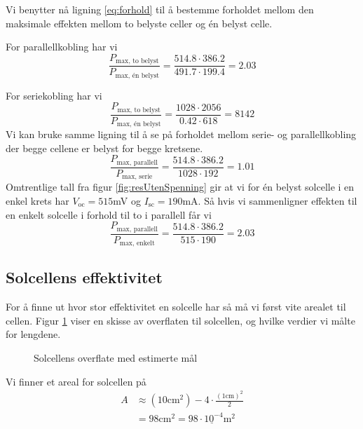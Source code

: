 \documentclass[a4paper,11pt, twocolumn]{article}
\begin{document}
Vi benytter nå ligning \eqref{eq:forhold} til å bestemme forholdet mellom den maksimale effekten mellom to belyste celler og \'en belyst celle. 

For parallellkobling har vi 
\begin{equation}
	\frac{P_\text{max, to belyst}}{P_\text{max, \'en belyst}} = \frac{514.8\cdot386.2}{491.7\cdot199.4} = 2.03
\end{equation}

For seriekobling har vi 
\begin{equation}
	\frac{P_\text{max, to belyst}}{P_\text{max, \'en belyst}} = \frac{1028\cdot2056}{0.42\cdot618} = 8142
\end{equation}
Vi kan bruke samme ligning til å se på forholdet mellom serie- og parallellkobling der begge cellene er belyst for begge kretsene.
\begin{equation}
	\frac{P_\text{max, parallell}}{P_\text{max, serie}} = \frac{514.8\cdot386.2}{1028\cdot192} = 1.01
\end{equation}
Omtrentlige tall fra figur \ref{fig:resUtenSpenning} gir at vi for \'en  belyst solcelle i en enkel krets har $V_\text{oc}=515$mV og $I_\text{sc}=190$mA. Så hvis vi sammenligner effekten til en enkelt solcelle i forhold til to i parallell får vi
\begin{equation}
	\frac{P_\text{max, parallell}}{P_\text{max, enkelt}} = \frac{514.8\cdot386.2}{515\cdot190} = 2.03
\end{equation}

\subsection{Solcellens effektivitet}
For å finne ut hvor stor effektivitet en solcelle har så må vi først vite arealet til cellen. Figur \ref{fig:solcelleoverflate} viser en skisse av overflaten til solcellen, og hvilke verdier vi målte for lengdene.
\begin{figure}[!ht]
\centering
	\caption{Solcellens overflate med estimerte mål}
	\label{fig:solcelleoverflate}
\end{figure}
Vi finner et areal for solcellen på
\begin{align}
	A &\approx (10\text{cm}^2)-4\cdot\frac{(1\text{cm})^2}{2}\\
	&= 98\text{cm}^2 = \underline{98\cdot 10^{-4}\text{m}^2}
\end{align}
\end{document}
